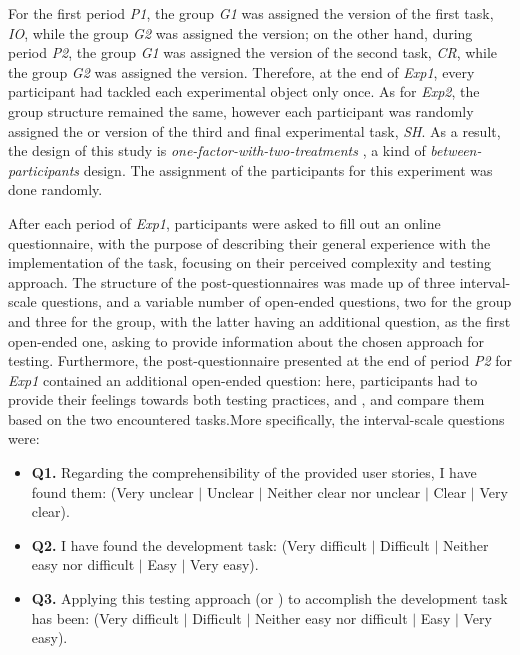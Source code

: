 For the first period \textit{P1}, the group \textit{G1} was assigned the \tdd version of the first task, \textit{IO}, while the group \textit{G2} was assigned the \notdd version; on the other hand, during period \textit{P2}, the group \textit{G1} was assigned the \notdd version of the second task, \textit{CR}, while the group \textit{G2} was assigned the \tdd version.
Therefore, at the end of \textit{Exp1}, every participant had tackled each experimental object only once.
As for \textit{Exp2}, the group structure remained the same, however each participant was randomly assigned the \tdd or \notdd version of the third and final experimental task, \textit{SH}. As a result, the design of this study is \textit{one-factor-with-two-treatments} \cite{DBLP:books/sp/WohlinRHOR00}, a kind of \textit{between-participants} design. The assignment of the participants for this experiment was done randomly.

After each period of \textit{Exp1}, participants were asked to fill out an online questionnaire, with the purpose of describing their general experience with the implementation of the task, focusing on their perceived complexity and testing approach. 
The structure of the post-questionnaires was made up of three interval-scale questions, and a variable number of open-ended questions, two for the \tdd group and three for the \notdd group, with the latter having an additional question, as the first open-ended one, asking to provide information about the chosen approach for testing. Furthermore, the post-questionnaire presented at the end of period \textit{P2} for \textit{Exp1} contained an additional open-ended question: here, participants had to provide their feelings towards both testing practices, \tdd and \notdd, and compare them based on the two encountered tasks.More specifically, the interval-scale questions were:

\begin{itemize}
    \item \textbf{Q1.} Regarding the comprehensibility of the provided user stories, I have found them: (Very unclear $|$ Unclear $|$ Neither clear nor unclear $|$ Clear $|$ Very clear).
    \item \textbf{Q2.} I have found the development task: (Very difficult $|$ Difficult $|$ Neither easy nor difficult $|$ Easy $|$ Very easy).
    \item \textbf{Q3.} Applying this testing approach (\ie \tdd or \notdd) to accomplish the development task has been: (Very difficult $|$ Difficult $|$ Neither easy nor difficult $|$ Easy $|$ Very easy).
\end{itemize}

